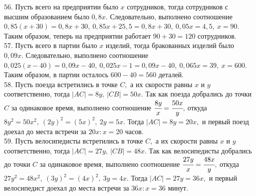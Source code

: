 \documentclass[12pt]{article}
\begin{document}
56. Пусть всего на предприятии было $x$ сотрудников, тогда сотрудников с высшим образованием было $0,8x.$ Следовательно, выполнено соотношение $0,85(x+30)=0,8x+30,\ 0,85x+25,5=0,8x+30,\ 0,05x=4,5,\ x=90.$ Таким образом, теперь на предприятии работает $90+30=120$ сотрудников.\\
57. Пусть всего в партии было $x$ изделий, тогда бракованных изделий было $0,09x.$ Следовательно, выполнено соотношение $0,025(x-40)=0,09x-40,\ 0,025x-1=0,09x-40,\ 0,065x=39,\ x=600.$ Таким образом, в партии осталось $600-40=560$ деталей.\\
58. Пусть поезда встретились в точке $C,$ а их скорости равны $x$ и $y$ соответственно, тогда $|AC|=8y,\ |CB|=50x.$ Так как поезда добрались до точки $C$ за одинаковое время, выполнено соотношение $\cfrac{8y}{x}=\cfrac{50x}{y},$ откуда $8y^2=50x^2,\ (2y)^2=(5x)^2,\ 2y=5x.$ Тогда $|AC|=8y=20x,$ и первый поезд доехал до места встречи за $20x:x=20$ часов.\\
59. Пусть велосипедисты встретились в точке $C,$ а их скорости равны $x$ и $y$ соответственно, тогда $|AC|=27y,\ |CB|=48x.$ Так как велосипедисты добрались до точки $C$ за одинаковое время, выполнено соотношение $\cfrac{27y}{x}=\cfrac{48x}{y},$ откуда $27y^2=48x^2,\ (3y)^2=(4x)^2,\ 3y=4x.$ Тогда $|AC|=27y=36x,$ и первый велосипедист доехал до места встречи за $36x:x=36$ минут.
\newpage
\end{document}
